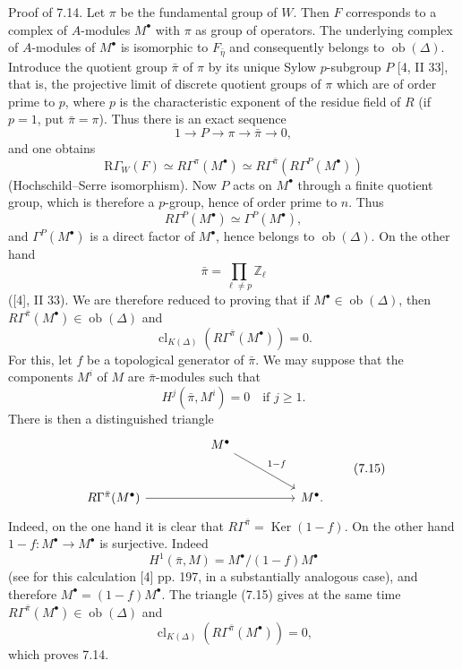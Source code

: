 \documentclass[11pt]{article}
\providecommand{\Ker}{\operatorname{Ker}}
\providecommand{\Ob}{\operatorname{ob}}
\providecommand{\Ker}{\operatorname{Ker}}
\providecommand{\Ker}{\operatorname{Ker}}
\providecommand{\Ob}{\operatorname{ob}}
\providecommand{\Ob}{\operatorname{Ob}}
\providecommand{\clK}[1]{\operatorname{cl}_{K(#1)}}
\providecommand{\RG}{\mathrm R\Gamma}
\begin{document}
Proof of 7.14. Let $\pi$ be the fundamental group of $W$. Then $F$ corresponds to a complex of $A$-modules $M^\bullet$ with $\pi$ as group of operators. The underlying complex of $A$-modules of $M^\bullet$ is isomorphic to $F_{\bar\eta}$ and consequently belongs to $\Ob(\Delta)$. Introduce the quotient group $\bar\pi$ of $\pi$ by its unique Sylow $p$-subgroup $P$ [4, II 33], that is, the projective limit of discrete quotient groups of $\pi$ which are of order prime to $p$, where $p$ is the characteristic exponent of the residue field of $R$ (if $p=1$, put $\bar\pi=\pi$). Thus there is an exact sequence
\[
1\longrightarrow P\longrightarrow \pi\longrightarrow \bar\pi\longrightarrow0,
\]
and one obtains
\[
\RG_W(F)\simeq R\Gamma^\pi(M^\bullet)
\simeq R\Gamma^{\bar\pi}(R\Gamma^P(M^\bullet))
\]
(Hochschild--Serre isomorphism). Now $P$ acts on $M^\bullet$ through a finite quotient group, which is therefore a $p$-group, hence of order prime to $n$. Thus
\[
R\Gamma^P(M^\bullet)\simeq \Gamma^P(M^\bullet),
\]
and $\Gamma^P(M^\bullet)$ is a direct factor of $M^\bullet$, hence belongs to $\Ob(\Delta)$. On the other hand
\[
\bar\pi=\prod_{\ell\ne p}\mathbb Z_\ell
\]
([4], II 33). We are therefore reduced to proving that if $M^\bullet\in\Ob(\Delta)$, then $R\Gamma^{\bar\pi}(M^\bullet)\in\Ob(\Delta)$ and
\[
\clK{\Delta}(R\Gamma^{\bar\pi}(M^\bullet))=0.
\]
For this, let $f$ be a topological generator of $\bar\pi$. We may suppose that the components $M^i$ of $M$ are $\bar\pi$-modules such that
\[
H^j(\bar\pi,M^i)=0\quad\text{if }j\ge1.
\]
There is then a distinguished triangle
\[
\begin{tikzcd}[column sep=huge,row sep=large]
& M^\bullet \arrow[dr,"1-f"] &\\
R\Gamma^{\bar\pi}(M^\bullet) \arrow[rr] && M^\bullet .
\end{tikzcd}
\tag{7.15}
\]
Indeed, on the one hand it is clear that $R\Gamma^{\bar\pi}=\Ker(1-f)$. On the other hand $1-f:M^\bullet\to M^\bullet$ is surjective. Indeed
\[
H^1(\bar\pi,M)=M^\bullet/(1-f)M^\bullet
\]
(see for this calculation [4] pp. 197, in a substantially analogous case), and therefore $M^\bullet=(1-f)M^\bullet$. The triangle (7.15) gives at the same time $R\Gamma^{\bar\pi}(M^\bullet)\in\Ob(\Delta)$ and
\[
\clK{\Delta}(R\Gamma^{\bar\pi}(M^\bullet))=0,
\]
which proves 7.14.
\end{document}
